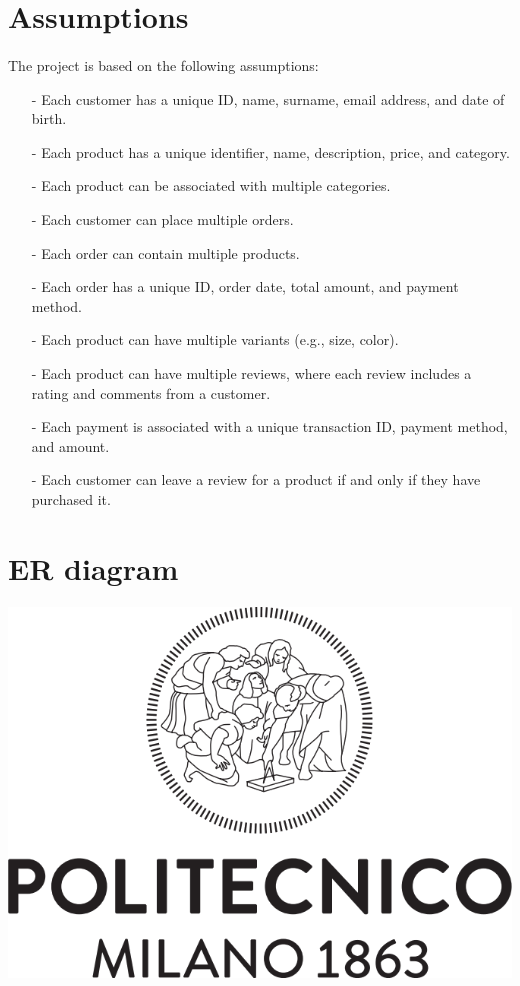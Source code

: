 \documentclass[a4paper,12pt]{article}
\begin{document}
\section{Assumptions}
\paragraph{} The project is based on the following assumptions:
\begin{itemize}[noitemsep]
   \item[-] Each customer has a unique ID, name, surname, email address, and date of birth.
   \item[-] Each product has a unique identifier, name, description, price, and category.
   \item[-] Each product can be associated with multiple categories.
   \item[-] Each customer can place multiple orders.
   \item[-] Each order can contain multiple products.
   \item[-] Each order has a unique ID, order date, total amount, and payment method.
   \item[-] Each product can have multiple variants (e.g., size, color).
   \item[-] Each product can have multiple reviews, where each review includes a rating and comments from a customer.
   \item[-] Each payment is associated with a unique transaction ID, payment method, and amount.
   \item[-] Each customer can leave a review for a product if and only if they have purchased it.
\end{itemize}

\clearpage
\section{ER diagram}
\paragraph{}
	\begin{center}
 		\includegraphics[width = 15 cm]{polilogo.png}
	\end{center}
\end{document}
